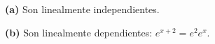 \noindent\textbf{(a)} Son linealmente independientes.

\noindent\textbf{(b)} Son linealmente dependientes: $e^{x+2}=e^2e^x$.
